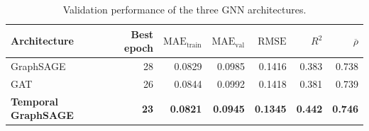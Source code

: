 \begin{table}[!htbp]
\centering
\footnotesize
\setlength{\tabcolsep}{4pt}
\caption{Validation performance of the three GNN architectures.}
\label{tab:gnn-architecture-comparison}
\begin{tabular}{lrrrrrr}
\toprule
Architecture & Best epoch & $\mathrm{MAE}_{\mathrm{train}}$ & $\mathrm{MAE}_{\mathrm{val}}$ & $\mathrm{RMSE}$ & $R^2$ & $\overline{\rho}$ \\
\midrule
GraphSAGE & 28 & 0.0829 & 0.0985 & 0.1416 & 0.383 & 0.738 \\
GAT & 26 & 0.0844 & 0.0992 & 0.1418 & 0.381 & 0.739 \\
\textbf{Temporal GraphSAGE} & \textbf{23} & \textbf{0.0821} & \textbf{0.0945} & \textbf{0.1345} & \textbf{0.442} & \textbf{0.746} \\
\bottomrule
\end{tabular}
\end{table}
